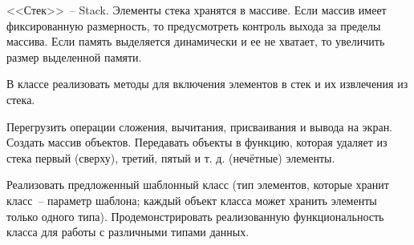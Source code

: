 
<<Стек>>~-- Stack. Элементы стека хранятся в массиве. Если массив имеет фиксированную
размерность, то предусмотреть контроль выхода за пределы массива. Если память
выделяется динамически и ее не хватает, то увеличить размер выделенной памяти.

В
классе реализовать методы для включения элементов в стек и их извлечения из стека.

Перегрузить операции сложения, вычитания, присваивания и вывода на экран. Создать
массив объектов. Передавать объекты в функцию, которая удаляет из стека первый
(сверху), третий, пятый и т. д. (нечётные) элементы.

Реализовать предложенный шаблонный класс (тип элементов, которые
хранит класс~-- параметр шаблона; каждый объект класса может хранить
элементы только одного типа). Продемонстрировать реализованную
функциональность класса для работы с различными типами данных.

